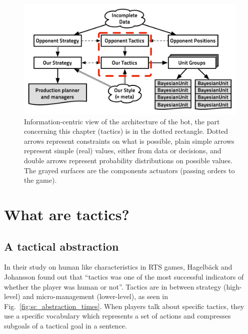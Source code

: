 \begin{figure}[!ht]
\begin{center}
\includegraphics[width=0.84\columnwidth]{images/starcraft_bbq_concept_TACTICS.pdf}
\end{center}
\label{fig:conceptTACTICS}
\caption{Information-centric view of the architecture of the bot, the part concerning this chapter (tactics) is in the dotted rectangle. Dotted arrows represent constraints on what is possible, plain simple arrows represent simple (real) values, either from data or decisions, and double arrows represent probability distributions on possible values. The grayed surfaces are the components actuators (passing orders to the game).}
\end{figure}

\section{What are tactics?}
\subsection{A tactical abstraction}
In their study on human like characteristics in RTS games, Hagelb\"{a}ck and Johansson \cite{HagelbackCIG10} found out that ``tactics was one of the most successful indicators of whether the player was human or not''. Tactics are in between strategy (high-level) and micro-management (lower-level), as seen in Fig.~\ref{fig:sc_abstraction_times}. When players talk about specific tactics, they use a specific vocabulary which represents a set of actions and compresses subgoals of a tactical goal in a sentence. %


